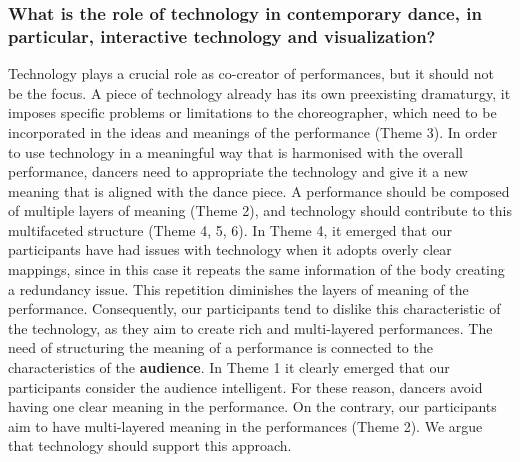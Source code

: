 \subsubsection{{ \textbf{What is the role of technology in contemporary dance, in particular, interactive technology and visualization}?}
}
Technology plays a crucial role as co-creator of performances, but it should not be the focus. A piece of technology already has its own preexisting dramaturgy, it imposes specific problems or limitations to the choreographer, which need to be incorporated in the ideas and meanings of the performance (Theme 3). %
 In order to use technology in a meaningful way that is harmonised with the overall performance, dancers need to appropriate the technology and give it a new meaning that is aligned with the dance piece. A performance should be composed of multiple layers of meaning (Theme 2), and technology should contribute to this multifaceted structure (Theme 4, 5, 6). In Theme 4, it emerged that our participants have had issues with technology when it adopts overly clear mappings, since in this case it repeats the same information of the body creating a redundancy issue.  %
This repetition diminishes the layers of meaning of the performance. Consequently, our participants tend to dislike this characteristic of the technology, as they aim to create rich and multi-layered performances. 
The need of structuring the meaning of a performance is connected to the characteristics of the \textbf{audience}. In Theme 1 it clearly emerged that our participants consider the audience intelligent. For these reason, dancers avoid having one clear meaning in the performance. On the contrary, our participants aim to have multi-layered meaning in the performances (Theme 2). We argue that technology should support this approach. 

